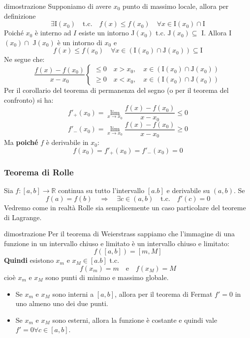 \documentclass[x11names]{article}
\begin{document}
\begin{es}{dimostrazione}
Supponiamo di avere $x_0$ punto di massimo locale, allora per definizione
\[
\exists \text{I}(x_0) \quad \text{t.c.} \quad f(x) \leq f(x_0) \quad \forall x \in \text{I}(x_0) \cap \text{I}
\]
Poiché $x_0$ è interno ad $I$ esiste un intorno J$(x_0)$ t.c. $\text{J}(x_0) \subseteq$ I. Allora I$(x_0) \cap$ J$(x_0)$ è un intorno di $x_0$ e 
\[
f(x) \leq f(x_0) \quad \forall x \in \left( \text{I}(x_0) \cap \text{J}(x_0)\right) \subseteq \text{I}
\]
Ne segue che:
\[
\frac{f(x) - f(x_0)}{x - x_0} \begin{cases}
     \leq 0 \quad x> x_0, \quad x \in \left( \text{I}(x_0) \cap \text{J}(x_0) \right)  \\
     \geq 0 \quad x< x_0, \quad x \in \left( \text{I}(x_0) \cap \text{J}(x_0) \right)
\end{cases}
\]
Per il corollario del teorema di permanenza del segno (o per il teorema del confronto) si ha:
\[
f'_+ (x_0) = \lim_{x\to x_0}\frac{f(x) - f(x_0)}{x - x_0} \leq 0
\]
\[
f'_- (x_0) = \lim_{x\to x_0}\frac{f(x) - f(x_0)}{x - x_0} \geq 0
\]
Ma \textbf{poiché} $f$ è derivabile in $x_0$:
\[
f(x_0) = f'_+(x_0) = f'_-(x_0) = 0
\]
\end{es}


\begin{center}
\colorbox{myred}{\begin{minipage}{5.75in}
\begin{redes}{}
\subsubsection{Teorema di Rolle}
Sia $f: [a,b] \to \mathbb{R}$ continua su tutto l'intervallo $[a.b]$ e derivabile su $(a,b)$. 
Se
\[
f(a) = f(b) \quad \Longrightarrow \quad \exists c \in (a,b) \quad \text{t.c.} \quad f'(c) = 0
\]
Vedremo come in realtà Rolle sia semplicemente un caso particolare del teoreme di Lagrange.
\end{redes}
\end{minipage}}        
\end{center}
\begin{es}{dimostrazione}
Per il teorema di Weierstrass sappiamo che l'immagine di una funzione in un intervallo chiuso e limitato è un intervallo chiuso e limitato:
\[
f([a,b]) =  [m,M]
\]
\textbf{Quindi} esistono $x_m$ e $x_M \in [a.b]$ t.c. 
\[
f(x_m) = m \quad \text{e} \quad f(x_M) = M
\]
cioè $x_m$ e $x_M$ sono punti di minimo e massimo globale. 
\begin{itemize}
    \item Se $x_m$ e $x_M$ sono interni a $[a,b]$, allora per il teorema di Fermat $f'=0$ in uno almeno uno dei due punti.
    \item Se $x_m$ e $x_M$ sono esterni, allora la funzione è costante e quindi vale $f'=0 \forall c \in [a,b]$.
\end{itemize}
\end{es}
\end{document}
